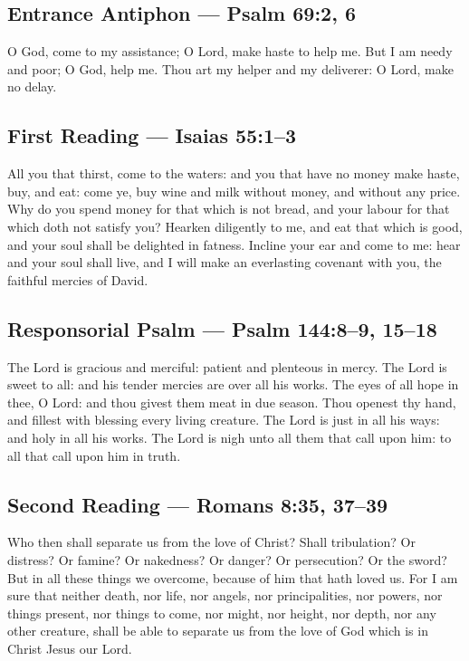 \subsection*{Entrance Antiphon --- Psalm 69:2, 6}
O God, come to my assistance; O Lord, make haste to help me. But I am needy
and poor; O God, help me. Thou art my helper and my deliverer: O Lord, make
no delay.

\subsection*{First Reading --- Isaias 55:1--3}
All you that thirst, come to the waters: and you that have no money make
haste, buy, and eat: come ye, buy wine and milk without money, and without
any price. Why do you spend money for that which is not bread, and your
labour for that which doth not satisfy you? Hearken diligently to me, and eat
that which is good, and your soul shall be delighted in fatness. Incline your
ear and come to me: hear and your soul shall live, and I will make an
everlasting covenant with you, the faithful mercies of David.

\subsection*{Responsorial Psalm --- Psalm 144:8--9, 15--18}
The Lord is gracious and merciful: patient and plenteous in mercy. The Lord
is sweet to all: and his tender mercies are over all his works. The eyes of
all hope in thee, O Lord: and thou givest them meat in due season. Thou
openest thy hand, and fillest with blessing every living creature. The Lord
is just in all his ways: and holy in all his works. The Lord is nigh unto all
them that call upon him: to all that call upon him in truth.

\subsection*{Second Reading --- Romans 8:35, 37--39}
Who then shall separate us from the love of Christ? Shall tribulation? Or
distress? Or famine? Or nakedness? Or danger? Or persecution? Or the sword?
But in all these things we overcome, because of him that hath loved us. For I
am sure that neither death, nor life, nor angels, nor principalities, nor
powers, nor things present, nor things to come, nor might, nor height, nor
depth, nor any other creature, shall be able to separate us from the love of
God which is in Christ Jesus our Lord.

